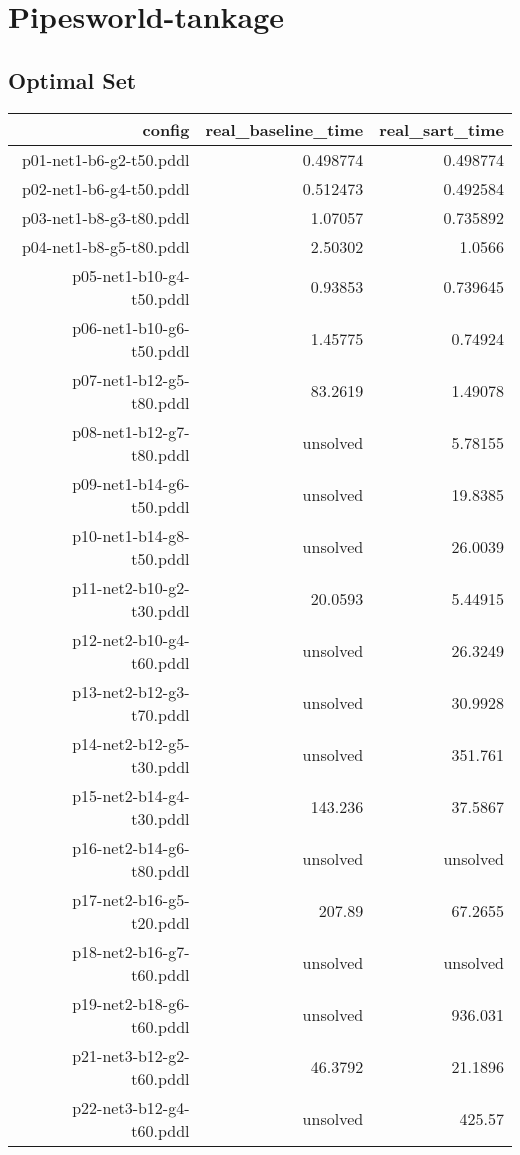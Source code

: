 \documentclass{article}
\begin{document}
                \newpage \section{Pipesworld-tankage}
                    \subsection*{Optimal Set}
                    
                            \begin{center}
                            \scriptsize
                            \begin{tabular}{r|r|r}
                            config & real\_baseline\_time & real\_sart\_time\\\midrule
                             p01-net1-b6-g2-t50.pddl&0.498774&0.498774\\
 p02-net1-b6-g4-t50.pddl&0.512473&0.492584\\
 p03-net1-b8-g3-t80.pddl&1.07057&0.735892\\
 p04-net1-b8-g5-t80.pddl&2.50302&1.0566\\
 p05-net1-b10-g4-t50.pddl&0.93853&0.739645\\
 p06-net1-b10-g6-t50.pddl&1.45775&0.74924\\
 p07-net1-b12-g5-t80.pddl&83.2619&1.49078\\
 p08-net1-b12-g7-t80.pddl&unsolved&5.78155\\
 p09-net1-b14-g6-t50.pddl&unsolved&19.8385\\
 p10-net1-b14-g8-t50.pddl&unsolved&26.0039\\
 p11-net2-b10-g2-t30.pddl&20.0593&5.44915\\
 p12-net2-b10-g4-t60.pddl&unsolved&26.3249\\
 p13-net2-b12-g3-t70.pddl&unsolved&30.9928\\
 p14-net2-b12-g5-t30.pddl&unsolved&351.761\\
 p15-net2-b14-g4-t30.pddl&143.236&37.5867\\
 p16-net2-b14-g6-t80.pddl&unsolved&unsolved\\
 p17-net2-b16-g5-t20.pddl&207.89&67.2655\\
 p18-net2-b16-g7-t60.pddl&unsolved&unsolved\\
 p19-net2-b18-g6-t60.pddl&unsolved&936.031\\
 p21-net3-b12-g2-t60.pddl&46.3792&21.1896\\
 p22-net3-b12-g4-t60.pddl&unsolved&425.57\\

\end{tabular}
\end{center}
\end{document}
